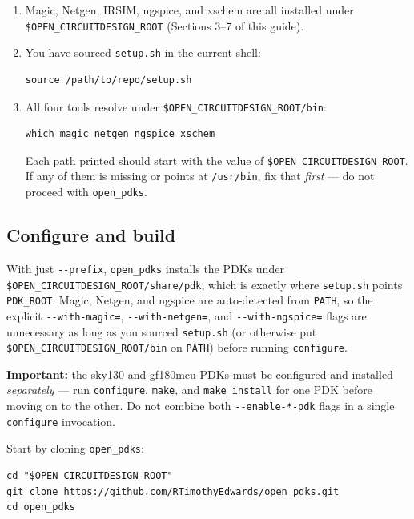 \documentclass[11pt]{article}
\begin{document}
\begin{enumerate}[leftmargin=2em]
  \item Magic, Netgen, IRSIM, ngspice, and xschem are all installed under
        \texttt{\$OPEN\_CIRCUITDESIGN\_ROOT} (Sections 3--7 of this guide).
  \item You have sourced \texttt{setup.sh} in the current shell:
        \begin{lstlisting}
source /path/to/repo/setup.sh
        \end{lstlisting}
  \item All four tools resolve under
        \texttt{\$OPEN\_CIRCUITDESIGN\_ROOT/bin}:
        \begin{lstlisting}
which magic netgen ngspice xschem
        \end{lstlisting}
        Each path printed should start with the value of
        \texttt{\$OPEN\_CIRCUITDESIGN\_ROOT}. If any of them is missing or
        points at \texttt{/usr/bin}, fix that \emph{first} --- do not
        proceed with \texttt{open\_pdks}.
\end{enumerate}

\subsection{Configure and build}

With just \texttt{-{}-prefix}, \texttt{open\_pdks} installs the PDKs under
\texttt{\$OPEN\_CIRCUITDESIGN\_ROOT/share/pdk}, which is exactly where
\texttt{setup.sh} points \texttt{PDK\_ROOT}. Magic, Netgen, and ngspice
are auto-detected from \texttt{PATH}, so the explicit
\texttt{-{}-with-magic=}, \texttt{-{}-with-netgen=}, and
\texttt{-{}-with-ngspice=} flags are unnecessary as long as you sourced
\texttt{setup.sh} (or otherwise put \texttt{\$OPEN\_CIRCUITDESIGN\_ROOT/bin}
on \texttt{PATH}) before running \texttt{configure}.

\textbf{Important:} the sky130 and gf180mcu PDKs must be configured and
installed \emph{separately} --- run \texttt{configure}, \texttt{make}, and
\texttt{make install} for one PDK before moving on to the other. Do not
combine both \texttt{-{}-enable-*-pdk} flags in a single \texttt{configure}
invocation.

Start by cloning \texttt{open\_pdks}:

\begin{lstlisting}
cd "$OPEN_CIRCUITDESIGN_ROOT"
git clone https://github.com/RTimothyEdwards/open_pdks.git
cd open_pdks
\end{lstlisting}
\end{document}
